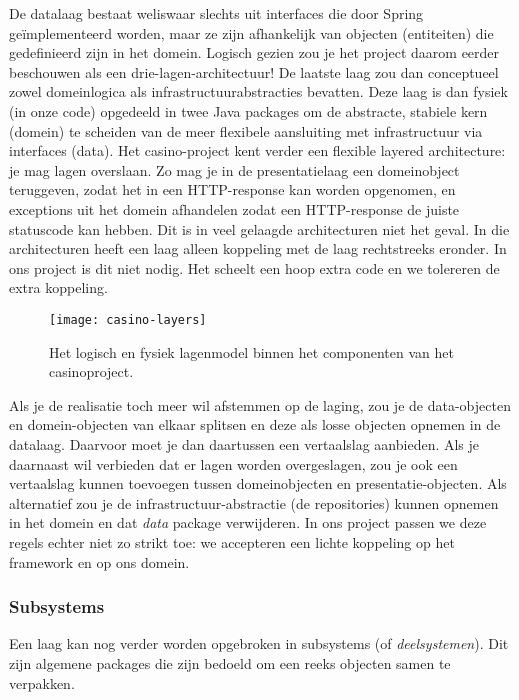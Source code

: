 De datalaag bestaat weliswaar slechts uit interfaces die door 
Spring geïmplementeerd worden, maar ze zijn afhankelijk van objecten (entiteiten) die
gedefinieerd zijn in het domein. Logisch gezien zou je het project daarom 
eerder beschouwen als een drie-lagen-architectuur! De laatste laag zou dan 
conceptueel zowel domeinlogica als infrastructuurabstracties bevatten. 
Deze laag is dan fysiek (in onze code) opgedeeld in twee Java packages 
om de abstracte, stabiele kern (domein) te scheiden van de meer flexibele 
aansluiting met infrastructuur via interfaces (data). 
Het casino-project kent verder een flexible layered architecture: 
je mag lagen overslaan.
Zo mag je in de presentatielaag een domeinobject teruggeven,
zodat het in een HTTP-response kan worden opgenomen, en exceptions uit het domein 
afhandelen zodat een HTTP-response de juiste statuscode kan hebben.
Dit is in veel gelaagde architecturen niet het geval. In die architecturen 
heeft een laag alleen koppeling met de laag rechtstreeks eronder.
In ons project is dit niet nodig. Het scheelt een hoop extra code en we 
tolereren de extra koppeling.

\begin{figure}[H]
    \centering
    \texttt{[image: casino-layers]}
    \caption{Het logisch en fysiek lagenmodel binnen het componenten van het casinoproject.}
    \label{fig:casino-layers}
\end{figure}

Als je de realisatie toch meer wil afstemmen op de laging, zou je de 
data-objecten en domein-objecten van elkaar splitsen en deze als losse objecten opnemen in de datalaag.
Daarvoor moet je dan daartussen een vertaalslag aanbieden. 
Als je daarnaast wil verbieden dat er lagen worden overgeslagen, 
zou je ook een vertaalslag kunnen toevoegen tussen domeinobjecten en presentatie-objecten.
Als alternatief zou je de infrastructuur-abstractie
(de repositories) kunnen opnemen in het domein en dat \textit{data} package verwijderen.
In ons project passen we deze regels echter niet zo strikt toe:
we accepteren een lichte koppeling op het framework en op ons domein.

\subsubsection{Subsystems}
Een laag kan nog verder worden opgebroken in subsystems (of \textit{deelsystemen}).
Dit zijn algemene packages die zijn bedoeld om een reeks objecten samen te verpakken.

